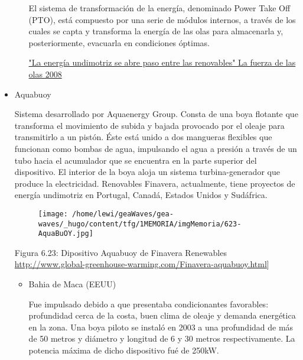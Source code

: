 \documentclass[]{article}
\begin{document}
\begin{itemize}
\begin{itemize}
    El sistema de transformación de la energía, denominado Power Take
    Off (PTO), está compuesto por una serie de módulos internos, a
    través de los cuales se capta y transforma la energía de las olas
    para almacenarla y, posteriormente, evacuarla en condiciones
    óptimas.

    \href{https://www.scribd.com/document/328163965/La-Fuerza-de-Las-Olas}{"La
    energía undimotriz se abre paso entre las renovables" La fuerza de
    las olas 2008}\\
  \end{itemize}
\item
  Aquabuoy

  Sistema desarrollado por Aquaenergy Group. Consta de una boya flotante
  que transforma el movimiento de subida y bajada provocado por el
  oleaje para transmitirlo a un pistón. Éste está unido a dos mangueras
  flexibles que funcionan como bombas de agua, impulsando el agua a
  presión a través de un tubo hacia el acumulador que se encuentra en la
  parte superior del dispositivo. El interior de la boya aloja un
  sistema turbina-generador que produce la electricidad. Renovables
  Finavera, actualmente, tiene proyectos de energía undimotriz en
  Portugal, Canadá, Estados Unidos y Sudáfrica.

  \begin{figure}
  \centering
  \texttt{[image: /home/lewi/geaWaves/gea-waves/\_hugo/content/tfg/1MEMORIA/imgMemoria/623-AquaBuOY.jpg]}
  \caption{}
  \end{figure}

  Figura 6.23: Dipositivo Aquabuoy de Finavera Renewables
  \url{http://www.global-greenhouse-warming.com/Finavera-aquabuoy.html}{]}

  \begin{itemize}
  \item
    Bahia de Maca (EEUU)

    Fue impulsado debido a que presentaba condicionantes favorables:
    profundidad cerca de la costa, buen clima de oleaje y demanda
    energética en la zona. Una boya piloto se instaló en 2003 a una
    profundidad de más de 50 metros y diámetro y longitud de 6 y 30
    metros respectivamente. La potencia máxima de dicho dispositivo fué
    de 250kW.
  \end{itemize}
\end{itemize}
\end{document}
